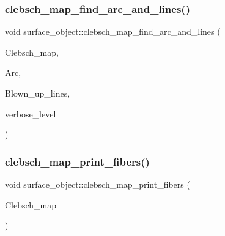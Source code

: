 \subsubsection{\texorpdfstring{clebsch\+\_\+map\+\_\+find\+\_\+arc\+\_\+and\+\_\+lines()}{clebsch\_map\_find\_arc\_and\_lines()}}
{\footnotesize\ttfamily void surface\+\_\+object\+::clebsch\+\_\+map\+\_\+find\+\_\+arc\+\_\+and\+\_\+lines (\begin{DoxyParamCaption}\item[{\mbox{\hyperlink{galois_8h_a09fddde158a3a20bd2dcadb609de11dc}{I\+NT}} $\ast$}]{Clebsch\+\_\+map,  }\item[{\mbox{\hyperlink{galois_8h_a09fddde158a3a20bd2dcadb609de11dc}{I\+NT}} $\ast$}]{Arc,  }\item[{\mbox{\hyperlink{galois_8h_a09fddde158a3a20bd2dcadb609de11dc}{I\+NT}} $\ast$}]{Blown\+\_\+up\+\_\+lines,  }\item[{\mbox{\hyperlink{galois_8h_a09fddde158a3a20bd2dcadb609de11dc}{I\+NT}}}]{verbose\+\_\+level }\end{DoxyParamCaption})}

\mbox{\label{classsurface__object_aa1d1b9e23f5204624159f5acc325003b}} 
\subsubsection{\texorpdfstring{clebsch\+\_\+map\+\_\+print\+\_\+fibers()}{clebsch\_map\_print\_fibers()}}
{\footnotesize\ttfamily void surface\+\_\+object\+::clebsch\+\_\+map\+\_\+print\+\_\+fibers (\begin{DoxyParamCaption}\item[{\mbox{\hyperlink{galois_8h_a09fddde158a3a20bd2dcadb609de11dc}{I\+NT}} $\ast$}]{Clebsch\+\_\+map }\end{DoxyParamCaption})}

\mbox{\label{classsurface__object_aeef0d278d1d82c7af525add5ae85d713}} 
